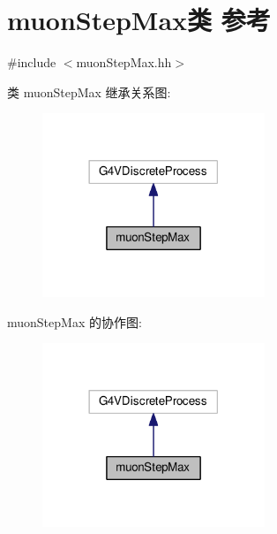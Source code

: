\hypertarget{classmuonStepMax}{}\section{muon\+Step\+Max类 参考}
\label{classmuonStepMax}


{\ttfamily \#include $<$muon\+Step\+Max.\+hh$>$}



类 muon\+Step\+Max 继承关系图\+:\nopagebreak
\begin{figure}[H]
\begin{center}
\leavevmode
\includegraphics[width=189pt]{classmuonStepMax__inherit__graph}
\end{center}
\end{figure}


muon\+Step\+Max 的协作图\+:\nopagebreak
\begin{figure}[H]
\begin{center}
\leavevmode
\includegraphics[width=189pt]{classmuonStepMax__coll__graph}
\end{center}
\end{figure}

